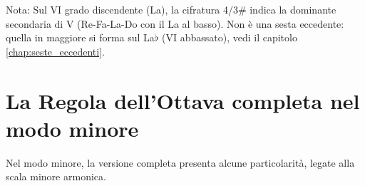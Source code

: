 \begin{esempio}
	\label{ex:regola_completa_disc_magg}
	Nota: Sul VI grado discendente (La), la cifratura 4/3\# indica la dominante secondaria  di V (Re-Fa\diesis{}-La-Do con il La al basso). Non è una sesta eccedente: quella in maggiore si forma sul La$\flat$ (VI abbassato), vedi il capitolo \ref{chap:seste_eccedenti}.
\end{esempio}

\section{La Regola dell'Ottava completa nel modo minore}
\label{sec:regola_completa_minore}

Nel modo minore, la versione completa presenta alcune particolarità, legate alla scala minore armonica.

